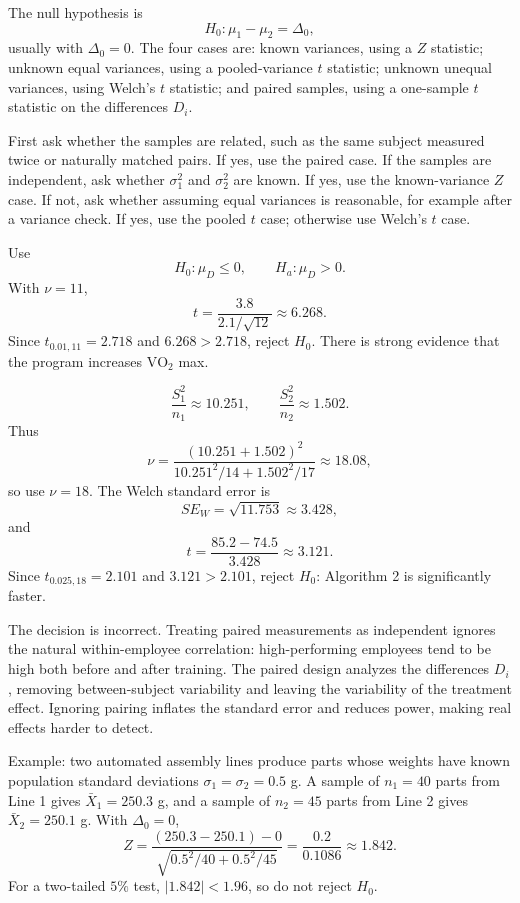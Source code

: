 \begin{solproblema}[prob:16e7075]
The null hypothesis is
\[
	H_0:\mu_1-\mu_2=\Delta_0,
\]
usually with $\Delta_0=0$. The four cases are: known variances, using a $Z$ statistic; unknown equal variances, using a pooled-variance $t$ statistic; unknown unequal variances, using Welch's $t$ statistic; and paired samples, using a one-sample $t$ statistic on the differences $D_i$.
\end{solproblema}

\begin{solproblema}[prob:b9ad2de]
First ask whether the samples are related, such as the same subject measured twice or naturally matched pairs. If yes, use the paired case. If the samples are independent, ask whether $\sigma_1^2$ and $\sigma_2^2$ are known. If yes, use the known-variance $Z$ case. If not, ask whether assuming equal variances is reasonable, for example after a variance check. If yes, use the pooled $t$ case; otherwise use Welch's $t$ case.
\end{solproblema}

\begin{solproblema}[prob:b0c0618]
Use
\[
	H_0:\mu_D\le0,\qquad H_a:\mu_D>0.
\]
With $\nu=11$,
\[
	t=\frac{3.8}{2.1/\sqrt{12}}\approx6.268.
\]
Since $t_{0.01,11}=2.718$ and $6.268>2.718$, reject $H_0$. There is strong evidence that the program increases $\text{VO}_2$ max.
\end{solproblema}

\begin{solproblema}[prob:f2e4336]
\[
	\frac{S_1^2}{n_1}\approx10.251,\qquad \frac{S_2^2}{n_2}\approx1.502.
\]
Thus
\[
	\nu=\frac{(10.251+1.502)^2}{10.251^2/14+1.502^2/17}\approx18.08,
\]
so use $\nu=18$. The Welch standard error is
\[
	SE_W=\sqrt{11.753}\approx3.428,
\]
and
\[
	t=\frac{85.2-74.5}{3.428}\approx3.121.
\]
Since $t_{0.025,18}=2.101$ and $3.121>2.101$, reject $H_0$: Algorithm 2 is significantly faster.
\end{solproblema}

\begin{solproblema}[prob:bf23a02]
The decision is incorrect. Treating paired measurements as independent ignores the natural within-employee correlation: high-performing employees tend to be high both before and after training. The paired design analyzes the differences $D_i$, removing between-subject variability and leaving the variability of the treatment effect. Ignoring pairing inflates the standard error and reduces power, making real effects harder to detect.
\end{solproblema}

\begin{solproblema}[prob:7fe0aa3]
Example: two automated assembly lines produce parts whose weights have known population standard deviations $\sigma_1=\sigma_2=0.5$ g. A sample of $n_1=40$ parts from Line 1 gives $\bar X_1=250.3$ g, and a sample of $n_2=45$ parts from Line 2 gives $\bar X_2=250.1$ g. With $\Delta_0=0$,
\[
	Z=\frac{(250.3-250.1)-0}{\sqrt{0.5^2/40+0.5^2/45}}
	=\frac{0.2}{0.1086}\approx1.842.
\]
For a two-tailed $5\%$ test, $|1.842|<1.96$, so do not reject $H_0$.
\end{solproblema}

